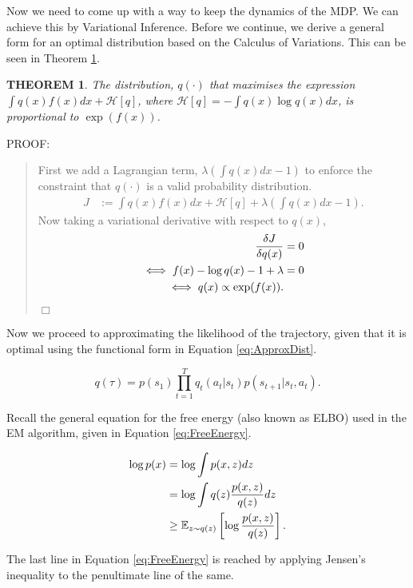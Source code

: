 \documentclass{report}
\newtheorem{theorem}{THEOREM}
\newenvironment{proof}{
PROOF:
\begin{quotation}}{
$\Box$ \end{quotation}}
\numberwithin{equation}{section}
\numberwithin{figure}{section}
\numberwithin{table}{section}
\numberwithin{algorithm}{section}
\begin{document}
Now we need to come up with a way to keep the dynamics of the MDP. 
We can achieve this by Variational Inference. Before we continue, 
we derive a general form for an optimal distribution based on 
the Calculus of Variations. This can be seen in Theorem \ref{thm:OptDist}.

\begin{theorem}\label{thm:OptDist}
  The distribution, $q(\cdot)$ that maximises the expression 
  $\int q(x)f(x)dx + \mathcal{H}[q]$, where $\mathcal{H}[q]=-\int q(x)\log q(x)dx$, 
  is proportional to $\exp (f(x))$.
\end{theorem}

\begin{proof}
  First we add a Lagrangian term, $\lambda(\int q(x)dx - 1)$ to 
  enforce the constraint that $q(\cdot)$ is a valid probability 
  distribution.
  \begin{align}
    J&:=\int q(x)f(x)dx + \mathcal{H}[q] + \lambda(\int q(x)dx - 1).
  \end{align}
  Now taking a variational derivative with respect to $q(x)$,
  \begin{align}
    \frac{\delta J}{\delta q(x)} &=0\notag\\
    \iff f(x) - \log q(x) - 1 + \lambda &=0\notag\\
    \iff q(x)\propto \exp(f(x)).
  \end{align}
\end{proof}

Now we proceed to approximating the likelihood of the trajectory, 
given that it is optimal using the functional form in Equation 
\ref{eq:ApproxDist}.

\begin{equation}\label{eq:ApproxDist}
  q(\tau)=p(s_1)\prod_{t=1}^Tq_t(a_t|s_t)p(s_{t+1}|s_t,a_t).
\end{equation}

Recall the general equation for the free energy (also known as ELBO) 
used in the EM algorithm, given in Equation \ref{eq:FreeEnergy}.

\begin{align}\label{eq:FreeEnergy}
  \log p(x)&=\log \int p(x,z)dz\notag\\
  &=\log \int q(z)\frac{p(x,z)}{q(z)}dz\notag\\
  &\ge \mathbb{E}_{z\sim q(z)}\left[\log \frac{p(x, z)}{q(z)}\right].
\end{align}

The last line in Equation \ref{eq:FreeEnergy} is reached by applying 
Jensen's inequality to the penultimate line of the same.
\end{document}
